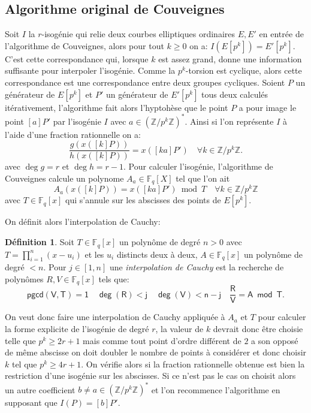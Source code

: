 \documentclass[10pt,a4paper]{book}
\theoremstyle{plain}
\theoremstyle{definition}
\theoremstyle{definition}
\theoremstyle{definition}
\theoremstyle{definition}
\newtheorem{defi}[thm]{Définition}
\theoremstyle{remark}
\theoremstyle{remark}
\theoremstyle{definition}
\begin{document}
\subsection{Algorithme original de Couveignes}
\label{sub:ori:cou}
Soit $I$ la $r$-isogénie qui relie deux courbes elliptiques ordinaires 
$E,E'$ en entrée de l'algorithme de Couveignes, alors pour tout $k \geqslant 0$
on a: $I(E[p^k])=E'[p^k]$. C'est cette correspondance qui, lorsque $k$ est 
assez grand, donne une information suffisante pour interpoler l'isogénie. Comme
la $p^k$-torsion est cyclique, alors cette correspondance est une 
correspondance entre deux groupes cycliques. Soient $P$ un générateur de 
$E[p^k]$ et $P'$ un générateur de $E'[p^k]$ tous deux calculés itérativement, 
l'algorithme fait alors l'hyptohèse que le point $P$ a pour image le point 
$[a]P'$ par l'isogénie $I$ avec $a \in (\mathbb{Z}/p^k\mathbb{Z})^*$. Ainsi si
l'on représente $I$ à l'aide d'une fraction rationnelle on a:
\begin{equation}
\frac{g(x([k] P))}{h(x([k] P))}=x([ka] P') \quad \forall k \in \mathbb{Z}/p^{k}\mathbb{Z}.
\end{equation}
avec $\deg g = r$ et $\deg h = r-1$.
Pour calculer l'isogénie, l'algorithme de Couveignes calcule un polynome $A_a \in \mathbb{F}_q[X]$ tel que l'on ait 
\begin{equation}
A_a(x([k] P))= x([ka] P') \bmod T \quad \forall k \in \mathbb{Z}/p^{k}\mathbb{Z}
\end{equation} 
avec $T \in \mathbb{F}_q[x]$ qui s'annule sur les abscisses des points de 
$E[p^k]$.

On définit alors l'interpolation de Cauchy:
\begin{defi}
Soit $T \in \mathbb{F}_q[x]$ un polynôme de degré $n>0$ avec 
$T=\prod_{i=1}^n(x-u_i)$ et les $u_i$ distincts deux à deux, 
$A \in \mathbb{F}_q[x]$ un polynôme de degré $<n$. Pour $j \in [1,n]$ une 
\emph{interpolation de Cauchy} est la recherche de polynômes $R,V \in \mathbb{F}_q[x]$
tels que:
\[
\mathsf{pgcd(V,T)=1 \quad \deg(R)<j \quad \deg(V)<n-j \quad \frac{R}{V}=A\bmod T}.
\]
\end{defi}
On veut donc faire une interpolation de Cauchy appliquée à $A_a$ et $T$ pour 
calculer la forme explicite de l'isogénie de degré $r$, la valeur de $k$ 
devrait donc être choisie telle que $p^k \geqslant 2 r +1$ mais comme tout 
point d'ordre différent de $2$ a son opposé de même abscisse on doit doubler le
nombre de points à considérer et donc choisir $k$ tel que 
$p^k \geqslant 4 r+1$. On vérifie alors si la fraction rationnelle obtenue est 
bien la restriction d'une isogénie sur les abscisses. Si ce n'est pas le cas on
choisit alors un autre coefficient $b \neq a \in 
\left( \mathbb{Z}/p^k \mathbb{Z} \right)^*$ et l'on 
recommence l'algorithme en supposant que $I(P)=[b] P'$.
\end{document}
